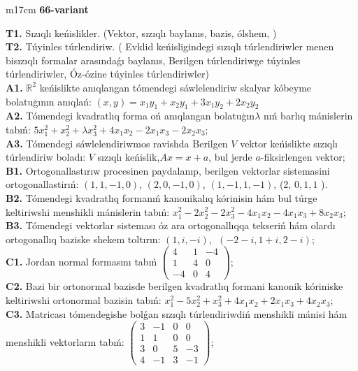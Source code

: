 \documentclass{article}
\begin{document}
\begin{tabular}{m{17cm}}
\textbf{66-variant}
\newline

\textbf{T1.} Sızıqlı keńislikler.   (Vektor,  sızıqlı baylanıs, bazis, ólshem, )  \\
\textbf{T2.} Túyinles túrlendiriw. ( Evklid keńisligindegi sızıqlı túrlendiriwler menen bisızıqlı formalar arasındaǵı baylanıs, Berilgen túrlendiriwge túyinles túrlendiriwler, Óz-ózine túyinles túrlendiriwler) \\
\textbf{A1.} \(\mathbb{R}^{2}\) keńislikte anıqlangan tómendegi sáwlelendiriw skalyar kóbeyme bolatuģının anıqlań: \((x,y) = x_{1}y_{1} + x_{2}y_{1} + 3x_{1}y_{2} + 2x_{2}y_{2}\) \\
\textbf{A2.} Tómendegi kvadratlıq forma oń anıqlangan bolatuģın\(\lambda\) nıń barlıq mánislerin tabıń: \(5x_{1}^{2} + x_{2}^{2} + \lambda x_{3}^{2} + 4x_{1}x_{2} - 2x_{1}x_{3} - 2x_{2}x_{3}\); \\
\textbf{A3.} Tómendegi sáwlelendiriwmos ravishda Berilgen \(V\) vektor keńislikte sızıqlı túrlendiriw boladı: \(V\) sızıqlı keńislik,\(Ax = x + a\), bul jerde \(a\)-fiksirlengen vektor; \\
\textbf{B1.} Ortogonallastırıw procesinen paydalanıp, berilgen vektorlar sistemasini ortogonallastirıń: \((1,1, - 1,0)\), \((2,0, - 1,0)\), \((1, - 1,1, - 1)\), (2, \(0,1,1\) ). \\
\textbf{B2.} Tómendegi kvadratlıq formanıń kanonikalıq kórinisin hám bul túrge keltiriwshi menshikli mánislerin tabıń: \(x_{1}^{2} - 2x_{2}^{2} - 2x_{3}^{2} - 4x_{1}x_{2} - 4x_{1}x_{3} + 8x_{2}x_{3}\); \\
\textbf{B3.} Tómendegi vektorlar sisteması óz ara ortogonallıqqa tekseriń hám olardı ortogonallıq baziske shekem toltırın: \((1,i, - i),\ \ ( - 2 - i,1 + i,2 - i)\); \\
\textbf{C1.} Jordan normal formasını tabıń \(\begin{pmatrix} 4 & 1 & - 4 \\ 1 & 4 & 0 \\  - 4 & 0 & 4 \end{pmatrix}\); \\
\textbf{C2.} Bazi bir ortonormal bazisde berilgen kvadratlıq formani kanonik kóriniske keltiriwshi ortonormal bazisin tabıń: \(x_{1}^{2} - 5x_{2}^{2} + x_{3}^{2} + 4x_{1}x_{2} + 2x_{1}x_{3} + 4x_{2}x_{3}\); \\
\textbf{C3.} Matricası tómendegishe bolǵan sızıqlı túrlendiriwdiń menshikli mánisi hám menshikli vektorların tabıń: \(\begin{pmatrix} 3 & - 1 & 0 & 0 \\ 1 & 1 & 0 & 0 \\ 3 & 0 & 5 & - 3 \\ 4 & - 1 & 3 & - 1 \end{pmatrix}\); \\

\end{tabular}
\vspace{1cm}
\end{document}
